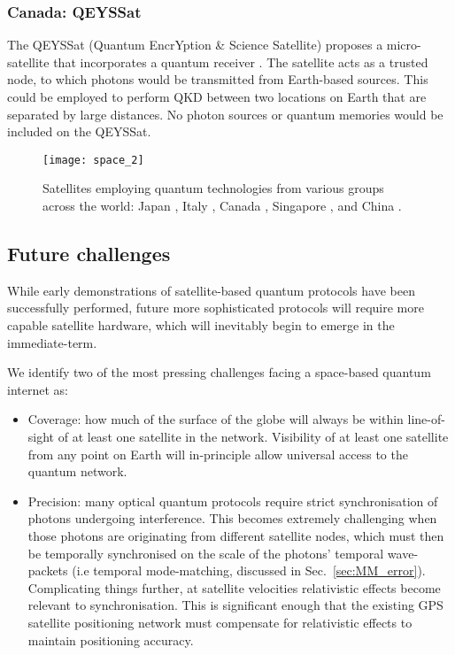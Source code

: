 %
%

\subsubsection{Canada: QEYSSat}

The QEYSSat (Quantum EncrYption \& Science Satellite) proposes a micro-satellite that incorporates a quantum receiver \cite{bib:jennewein2014qeyssat}. The satellite acts as a trusted node, to which photons would be transmitted from Earth-based sources. This could be employed to perform QKD between two locations on Earth that are separated by large distances. No photon sources or quantum memories would be included on the QEYSSat. 

\begin{figure*}[!htb]
\texttt{[image: space\_2]}
\caption{Satellites employing quantum technologies from various groups across the world: Japan \cite{bib:horiuchi2015view}, Italy \cite{bib:vallone15}, Canada \cite{bib:jennewein2014qeyssat}, Singapore \cite{bib:tang2016generation}, and China \cite{bib:gibney16}. }
\label{fig:space_2}
\end{figure*}

%
%

\subsection{Future challenges}

While early demonstrations of satellite-based quantum protocols have been successfully performed, future more sophisticated protocols will require more capable satellite hardware, which will inevitably begin to emerge in the immediate-term.

We identify two of the most pressing challenges facing a space-based quantum internet as:
\begin{itemize}
\item Coverage: how much of the surface of the globe will always be within line-of-sight of at least one satellite in the network. Visibility of at least one satellite from any point on Earth will in-principle allow universal access to the quantum network.
\item Precision: many optical quantum protocols require strict synchronisation of photons undergoing interference. This becomes extremely challenging when those photons are originating from different satellite nodes, which must then be temporally synchronised on the scale of the photons' temporal wave-packets (i.e temporal mode-matching, discussed in Sec.~\ref{sec:MM_error}). Complicating things further, at satellite velocities relativistic effects become relevant to synchronisation. This is significant enough that the existing GPS satellite positioning network must compensate for relativistic effects to maintain positioning accuracy.
\end{itemize}

